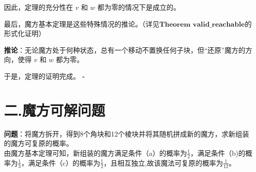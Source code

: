 \documentclass{article}
\begin{document}
因此，定理的充分性在 \( v \) 和 \( w \) 都为零的情况下是成立的。
\newpage 

最后，魔方基本定理是这些特殊情况的推论。（详见$\mathbf{Theorem}\,\,\mathbf{valid}\_\mathbf{reachable}$的形式化证明）

\textbf{推论}：无论魔方处于何种状态，总有一个移动不置换任何子块，但“还原”魔方的方向，使得 \( v \) 和 \( w \) 都为零。


于是，定理的证明完成。 \(\square\)

\section*{二.魔方可解问题}

\textbf{问题}：将魔方拆开，得到8个角块和12个棱块并将其随机拼成新的魔方，求新组装的魔方可复原的概率。\\

由魔方基本定理可知，新组装的魔方满足条件（a）的概率为$\frac{1}{2}$，满足条件（b)的概率为$\frac{1}{3}$，满足条件（c）的概率为$\frac{1}{2}$，且相互独立,故该魔法可复原的概率为$\frac{1}{12}$。
\end{document}
